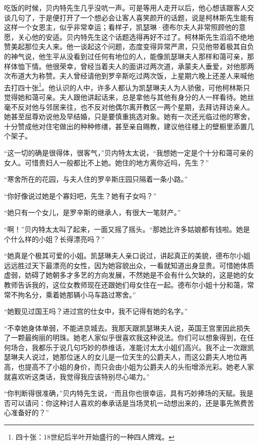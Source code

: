 \par 吃饭的时候，贝内特先生几乎没吭一声。可是等用人走开以后，他心想该跟客人交谈几句了，于是便打开了一个想必会让客人喜笑颜开的话题，说是柯林斯先生能有这样一个女恩主，似乎非常幸运；看样子，凯瑟琳·德布尔夫人非常照顾他的意愿，关心他的安适。贝内特先生这个话题选得再好不过了。柯林斯先生滔滔不绝地赞美起那位夫人来。他一谈起这个问题，态度变得异常严肃，只见他带着极其自负的神气说，他生平从没看到过任何有地位的人，能像凯瑟琳夫人那样和蔼可亲，那样体恤下情。他很荣幸，曾经当着夫人的面讲过两次道，承蒙夫人垂爱，对他那两次布道大为称赞。夫人曾经请他到罗辛斯吃过两次饭，上星期六晚上还差人来喊他去打四十张\footnote{四十张：18世纪后半叶开始盛行的一种四人牌戏。}。他认识的人中，许多人都认为凯瑟琳夫人为人骄傲，可他柯林斯只觉得她和蔼可亲。夫人跟他讲起话来，总是拿他与其他有身分的人一样看待。她丝毫不反对他与邻居来往，也不反对他偶尔离开教区一两个星期，去拜访拜访亲人。她甚至屈尊劝说他及早结婚，只是要慎重挑选对象。她有一次还光临过他的寒舍，十分赞成他对住宅做出的种种修缮，甚至亲自赐教，建议他往楼上的壁橱里添置几个架子。
\par “这一切的确是很得体，很客气，”贝内特太太说，“我想她一定是个十分和蔼可亲的女人。可惜贵妇人一般都比不上她。她住的地方离你近吗，先生？”
\par “寒舍所在的花园，与夫人住的罗辛斯庄园只隔着一条小路。”
\par “你好像说过她是个寡妇吧，先生？她有子女吗？”
\par “她只有一个女儿，是罗辛斯的继承人，有很大一笔财产。”
\par “啊！”贝内特太太叫了起来，一面又摇了摇头。“那她比许多姑娘都有钱啦。她是个什么样的小姐？长得漂亮吗？”
\par “她真是个极其可爱的小姐。凯瑟琳夫人亲口说过，讲起真正的美貌，德布尔小姐远远胜过天下最漂亮的女性，因为她容貌出众，一看就知道出身显贵。可惜她体质虚弱，妨碍了她朝多才多艺的方向发展，不然她是不会有什么欠缺的，这是她的女教师告诉我的，这位女教师现在还跟她们母女住在一起。德布尔小姐十分和蔼，常常不拘名分，乘着她那辆小马车路过寒舍。”
\par “她觐见过国王吗？进过宫的仕女中，我不记得有她的名字。”
\par “不幸她身体单弱，不能进京城去。我那天跟凯瑟琳夫人说，英国王宫里因此损失了一颗最绚丽的明珠。她老人家似乎很喜欢我这种说法。你们可以想象得到，在任何场合，我都乐于说几句巧妙的恭维话，准能讨太太小姐们高兴。我不止一次跟凯瑟琳夫人说过，她那位迷人的女儿是一位天生的公爵夫人，而这公爵夫人地位再高，也提高不了小姐的身价，而只会由小姐为公爵夫人的头衔增添光彩。她老人家就喜欢听这类话，我觉得我应该特别尽心竭力。”
\par “你判断得很准确，”贝内特先生说，“而且你也很幸运，具有巧妙捧场的天赋。我是否可以请问：你这种讨人喜欢的奉承话是当场灵机一动想出来的，还是事先煞费苦心准备好的？”
